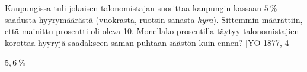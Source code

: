 \begin{tehtavasivu}
\begin{tehtava}
    Kaupungissa tuli jokaisen talonomistajan suorittaa kaupungin kassaan $5~\%$ saadusta
    hyyrymäärästä (vuokrasta, ruotsin sanasta \textit{hyra}). Sittemmin määrättiin, että mainittu
    prosentti oli oleva 10. Monellako prosentilla täytyy talonomistajien korottaa hyyryjä
    saadakseen saman puhtaan säästön kuin ennen? [YO 1877, 4]
    \begin{vastaus}
        $5,6~\%$
    \end{vastaus}
\end{tehtava}

\end{tehtavasivu}
